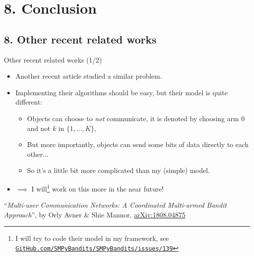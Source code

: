 \section{\hfill{}8. Conclusion\hfill{}}


\subsection{\hfill{}8. Other recent related works\hfill{}}

\begin{frame}{Other recent related works (1/2)}

\begin{itemize}\tightlist
\item
Another recent article studied a similar problem.

\pause

\item
Implementing their algorithms should be easy, but their model is quite different:

  \begin{itemize}\tightlist
  \item
  Objects can choose to \emph{not} communicate, it is denoted by choosing arm $0$ and not $k$ in $\{1,\dots,K\}$,

  \item
  \danger{} But more importantly, objects can send some bits of data directly to each other...

  \item
  So it's a little bit more complicated than my (simple) model.
  \end{itemize}

\pause
\item
$\implies$ I will\footnote{\tiny I will try to code their model in my framework, see \href{https://github.com/SMPyBandits/SMPyBandits/issues/139}{\texttt{GitHub.com/SMPyBandits/SMPyBandits/issues/139}}}
work on this more in the near future!

\end{itemize}

\vfill{}
\begin{footnotesize}
  ``\emph{Multi-user Communication Networks: A Coordinated Multi-armed Bandit Approach}'',
  by Orly Avner \& Shie Mannor,
  \textcolor{blue}{\href{https://arxiv.org/abs/1808.04875}{arXiv:1808.04875}}
\end{footnotesize}

\end{frame}


